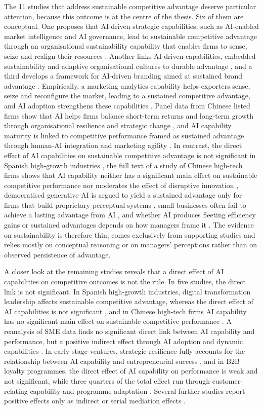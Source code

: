 The 11 studies that address sustainable competitive advantage deserve particular attention, because this outcome is at the centre of the thesis. Six of them are conceptual. One proposes that AI-driven strategic capabilities, such as AI-enabled market intelligence and AI governance, lead to sustainable competitive advantage through an organisational sustainability capability that enables firms to sense, seize and realign their resources . Another links AI-driven capabilities, embedded sustainability and adaptive organisational cultures to durable advantage , and a third develops a framework for AI-driven branding aimed at sustained brand advantage . Empirically, a marketing analytics capability helps exporters sense, seize and reconfigure the market, leading to a sustained competitive advantage, and AI adoption strengthens these capabilities . Panel data from Chinese listed firms show that AI helps firms balance short-term returns and long-term growth through organisational resilience and strategic change , and AI capability maturity is linked to competitive performance framed as sustained advantage through human-AI integration and marketing agility . In contrast, the direct effect of AI capabilities on sustainable competitive advantage is not significant in Spanish high-growth industries , the full text of a study of Chinese high-tech firms shows that AI capability neither has a significant main effect on sustainable competitive performance nor moderates the effect of disruptive innovation , democratised generative AI is argued to yield a sustained advantage only for firms that build proprietary perceptual systems , small businesses often fail to achieve a lasting advantage from AI , and whether AI produces fleeting efficiency gains or sustained advantages depends on how managers frame it . The evidence on sustainability is therefore thin, comes exclusively from supporting studies and relies mostly on conceptual reasoning or on managers' perceptions rather than on observed persistence of advantage.

A closer look at the remaining studies reveals that a direct effect of AI capabilities on competitive outcomes is not the rule. In five studies, the direct link is not significant. In Spanish high-growth industries, digital transformation leadership affects sustainable competitive advantage, whereas the direct effect of AI capabilities is not significant , and in Chinese high-tech firms AI capability has no significant main effect on sustainable competitive performance . A reanalysis of SME data finds no significant direct link between AI capability and performance, but a positive indirect effect through AI adoption and dynamic capabilities . In early-stage ventures, strategic resilience fully accounts for the relationship between AI capability and entrepreneurial success , and in B2B loyalty programmes, the direct effect of AI capability on performance is weak and not significant, while three quarters of the total effect run through customer-relating capability and programme adaptation . Several further studies report positive effects only as indirect or serial mediation effects .

